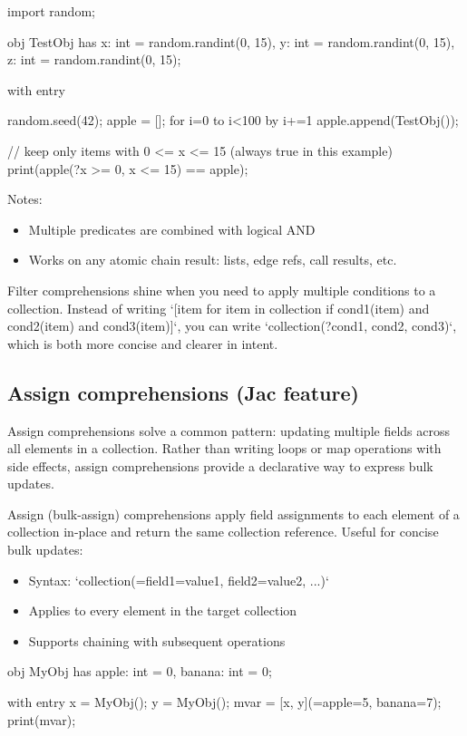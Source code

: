 \begin{jacblock}
import random;

obj TestObj {
    has x: int = random.randint(0, 15),
        y: int = random.randint(0, 15),
        z: int = random.randint(0, 15);
}

with entry {
    random.seed(42);
    apple = [];
    for i=0 to i<100 by i+=1  {
        apple.append(TestObj());
    }

    // keep only items with 0 <= x <= 15 (always true in this example)
    print(apple(?x >= 0, x <= 15) == apple);
}
\end{jacblock}

Notes:
\begin{itemize}
    \item Multiple predicates are combined with logical AND
    \item Works on any atomic chain result: lists, edge refs, call results, etc.
\end{itemize}

Filter comprehensions shine when you need to apply multiple conditions to a collection. Instead of writing `[item for item in collection if cond1(item) and cond2(item) and cond3(item)]`, you can write `collection(?cond1, cond2, cond3)`, which is both more concise and clearer in intent.

\subsection{Assign comprehensions (Jac feature)}

Assign comprehensions solve a common pattern: updating multiple fields across all elements in a collection. Rather than writing loops or map operations with side effects, assign comprehensions provide a declarative way to express bulk updates.

Assign (bulk-assign) comprehensions apply field assignments to each element of a collection in-place and return the same collection reference. Useful for concise bulk updates:

\begin{itemize}
    \item Syntax: `collection(=field1=value1, field2=value2, ...)`
    \item Applies to every element in the target collection
    \item Supports chaining with subsequent operations
\end{itemize}

\begin{jacblock}
obj MyObj {
    has apple: int = 0,
        banana: int = 0;
}

with entry {
    x = MyObj();
    y = MyObj();
    mvar = [x, y](=apple=5, banana=7);
    print(mvar);
}
\end{jacblock}

